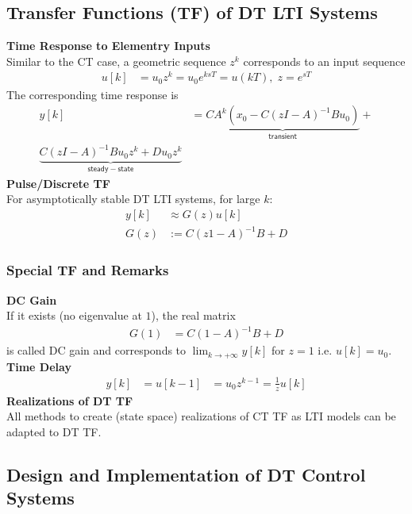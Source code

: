 \subsection{Transfer Functions (TF) of DT LTI Systems}
\textbf{Time Response to Elementry Inputs}\\
Similar to the CT case, a geometric sequence $z^k$ corresponds to an input sequence
\noindent\begin{align*}
    u[k] & =u_0z^k=u_0e^{ksT}=u(kT), \; z=e^{sT}
\end{align*}
The corresponding time response is
\noindent\begin{align*}
    y[k] & = \underbrace{CA^k(x_0-C(zI-A)^{-1}Bu_0)}_{\mathsf{transient}}+ \\\underbrace{C(zI-A)^{-1}Bu_0z^k+Du_0z^k}_{\mathsf{steady-state}}
\end{align*}
\textbf{Pulse/Discrete TF}\\
For asymptotically stable DT LTI systems, for large $k$:
\noindent\begin{align*}
    y[k] & \approx G(z)u[k]  \\
    G(z) & :=C(z1-A)^{-1}B+D
\end{align*}
\subsubsection{Special TF and Remarks}
\textbf{DC Gain}\\
If it exists (no eigenvalue at $1$), the real matrix
\noindent\begin{align*}
    G(1) & =C(1-A)^{-1}B+D
\end{align*}
is called DC gain and corresponds to $\lim_{k\to+\infty}y[k]$ for $z=1$ i.e. $u[k]=u_0$.\\
%
\textbf{Time Delay}\\
\noindent\begin{align*}
    y[k] & =u[k-1] & =u_0z^{k-1}=\frac1zu[k]
\end{align*}
\textbf{Realizations of DT TF}\\
All methods to create (state space) realizations of CT TF as LTI models can be adapted to DT TF.
%
%
\newpage
\subsection{Design and Implementation of DT Control Systems}
